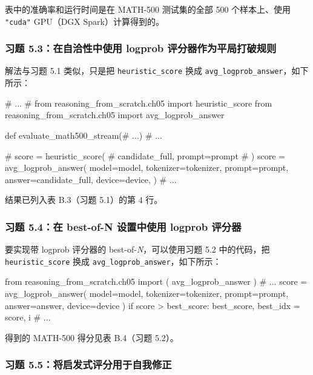 表中的准确率和运行时间是在 MATH-500 测试集的全部 500 个样本上、使用 \texttt{"}\texttt{cuda}\texttt{"} GPU（DGX Spark）计算得到的。

\subsubsection*{习题 5.3：在自洽性中使用 logprob 评分器作为平局打破规则}

解法与习题 5.1 类似，只是把 \texttt{heuristic\_score} 换成 \texttt{avg\_logprob\_answer}，如下所示：

\begin{codebox}
# ...
# from reasoning_from_scratch.ch05 import heuristic_score
from reasoning_from_scratch.ch05 import avg_logprob_answer

def evaluate_math500_stream(# ...)
    # ...

    # score = heuristic_score(
    #    candidate_full, prompt=prompt
    # )
    score = avg_logprob_answer(
        model=model,
        tokenizer=tokenizer,
        prompt=prompt,
        answer=candidate_full,
        device=device,
    )
   # ...
\end{codebox}

结果已列入表 B.3（习题 5.1）的第 4 行。

\subsubsection*{习题 5.4：在 best-of-N 设置中使用 logprob 评分器}

要实现带 logprob 评分器的 best-of-\emph{N}，可以使用习题 5.2 中的代码，把 \texttt{heuristic\_score} 换成 \texttt{avg\_logprob\_answer}，如下所示：

\begin{codebox}
from reasoning_from_scratch.ch05 import (
    avg_logprob_answer
)
# ...
            score = avg_logprob_answer(
                model=model,
                tokenizer=tokenizer,
                prompt=prompt,
                answer=answer,
                device=device
            )
        if score > best_score:
            best_score, best_idx = score, i
# ...
\end{codebox}

得到的 MATH-500 得分见表 B.4（习题 5.2）。

\subsubsection*{习题 5.5：将启发式评分用于自我修正}

